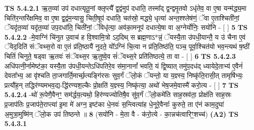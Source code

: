 \documentclass[17pt]{extarticle}
\begin{document}
                                        \textbf{ TS 5.4.2.1} \newline
                  ऋ॒त॒व्या॑ उप॑ दधात्यृतू॒नां क्लृप्त्यै᳚ द्व॒द्वंमुप॑ दधाति॒ तस्मा᳚द् द्व॒न्द्वमृ॒तवो ऽधृ॑तेव॒ वा ए॒षा यन्म॑द्ध्य॒मा चिति॑र॒न्तरि॑क्षमिव॒ वा ए॒षा द्व॒द्वंम॒न्यासु॒ चिती॒षूप॑ दधाति॒ चत॑स्रो॒ मद्ध्ये॒ धृत्या॑ अन्त॒श्श्लेष॑णं॒ ॅवा ए॒ताश्चिती॑नां॒ ॅयदृ॑त॒व्या॑ यदृ॑त॒व्या॑ उप॒दधा॑ति॒ चिती॑नां॒ ॅविधृ॑त्या॒ अव॑का॒मनूप॑ दधात्ये॒षा वा अ॒ग्नेर्योनिः॒ सयो॑नि - [  ] \textbf{  5} \newline
                  \newline
                                \textbf{ TS 5.4.2.2} \newline
                  -मे॒वाग्निं चि॑नुत उ॒वाच॑ ह वि॒श्वामि॒त्रो ऽद॒दिथ् स ब्रह्म॒णाऽ*न्नं॒ ॅयस्यै॒ता उ॑पधी॒यान्तै॒ य उ॑ चैना ए॒वं ॅवेद॒दिति॑ संॅवथ्स॒रो वा ए॒तं प्र॑ति॒ष्ठायै॑ नुदते॒ यो᳚ऽग्निं चि॒त्वा न प्र॑ति॒तिष्ठ॑ति॒ पञ्च॒ पूर्वा॒श्चित॑यो भव॒न्त्यथ॑ ष॒ष्ठीं चितिं॑ चिनुते॒ षड्वा ऋ॒तवः॑ संॅवथ्स॒र ऋ॒तुष्वे॒व सं॑ॅवथ्स॒रे प्रति॑तिष्ठत्ये॒ ता वा - [  ] \textbf{  6} \newline
                  \newline
                                \textbf{ TS 5.4.2.3} \newline
                  अधि॑पत्नी॒र्नामेष्ट॑का॒ यस्यै॒ता उ॑पधी॒यन्तेऽधि॑पतिरे॒व स॑मा॒नानां᳚ भवति॒ यं द्वि॒ष्यात् तमु॑प॒दध॑द् ध्यायेदे॒ताभ्य॑ ए॒वैनं॑ देवता᳚भ्य॒ आ वृ॑श्चति ता॒जगार्ति॒मार्च्छ॒त्यङ्गि॑रसः सुव॒र्गं ॅलो॒कं ॅयन्तो॒ या य॒ज्ञ्स्य॒ निष्कृ॑ति॒रासी॒त् तामृषि॑भ्यः॒ प्रत्यौ॑ह॒न् तद्धिर॑ण्यमभव॒द्य-द्धि॑रण्यश॒ल्कैः प्रो॒क्षति॑ य॒ज्ञ्स्य॒ निष्कृ॑त्या॒ अथो॑ भेष॒जमे॒वास्मै॑ करो॒त्य - [  ] \textbf{  7} \newline
                  \newline
                                \textbf{ TS 5.4.2.4} \newline
                  -थो॑ रू॒पेणै॒वैनꣳ॒॒ सम॑र्द्धय॒त्यथो॒ हिर॑ण्यज्योतिषै॒व सु॑व॒र्गं ॅलो॒कमे॑ति साह॒स्रव॑ता॒ प्रोक्ष॑ति साह॒स्रः प्र॒जाप॑तिः प्र॒जाप॑ते॒राप्त्या॑ इ॒मा मे॑ अग्न॒ इष्ट॑का धे॒नवः॑ स॒न्त्वित्या॑ह धे॒नूरे॒वैनाः᳚ कुरुते॒ ता ए॑नं काम॒दुघा॑ अ॒मुत्रा॒मुष्मि॑न् ॅलो॒क उप॑ तिष्ठन्ते ॥ \textbf{  8} \newline
                  \newline
                      (सयो॑नि - मे॒ता वै - क॑रो॒त्ये - का॒न्नच॑त्वारिꣳ॒॒शच्च॑)  \textbf{(A2)} \newline \newline
                                        \textbf{ TS 5.4.3.1} \newline
\end{document}
